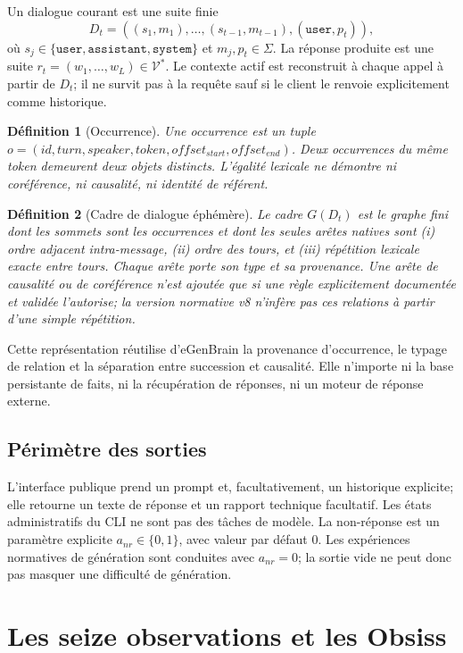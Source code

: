 \documentclass[11pt,a4paper]{report}
\newtheorem{definition}{Définition}[chapter]
\newcommand{\V}{\mathcal V}
\begin{document}
Un dialogue courant est une suite finie
\[
D_t=((s_1,m_1),\ldots,(s_{t-1},m_{t-1}),(\texttt{user},p_t)),
\]
où $s_j\in\{\texttt{user},\texttt{assistant},\texttt{system}\}$ et $m_j,p_t\in\Sigma$. La réponse produite est une suite $r_t=(w_1,\ldots,w_L)\in\V^*$. Le contexte actif est reconstruit à chaque appel à partir de $D_t$; il ne survit pas à la requête sauf si le client le renvoie explicitement comme historique.

\begin{definition}[Occurrence]
Une occurrence est un tuple $o=(id,turn,speaker,token,offset_{start},offset_{end})$. Deux occurrences du même token demeurent deux objets distincts. L'égalité lexicale ne démontre ni coréférence, ni causalité, ni identité de référent.
\end{definition}

\begin{definition}[Cadre de dialogue éphémère]
Le cadre $G(D_t)$ est le graphe fini dont les sommets sont les occurrences et dont les seules arêtes natives sont (i) ordre adjacent intra-message, (ii) ordre des tours, et (iii) répétition lexicale exacte entre tours. Chaque arête porte son type et sa provenance. Une arête de causalité ou de coréférence n'est ajoutée que si une règle explicitement documentée et validée l'autorise; la version normative v8 n'infère pas ces relations à partir d'une simple répétition.
\end{definition}

Cette représentation réutilise d'eGenBrain la provenance d'occurrence, le typage de relation et la séparation entre succession et causalité. Elle n'importe ni la base persistante de faits, ni la récupération de réponses, ni un moteur de réponse externe.

\section{Périmètre des sorties}
L'interface publique prend un prompt et, facultativement, un historique explicite; elle retourne un texte de réponse et un rapport technique facultatif. Les états administratifs du CLI ne sont pas des tâches de modèle. La non-réponse est un paramètre explicite $a_{nr}\in\{0,1\}$, avec valeur par défaut $0$. Les expériences normatives de génération sont conduites avec $a_{nr}=0$; la sortie vide ne peut donc pas masquer une difficulté de génération.

\chapter{Les seize observations et les Obsiss}
\end{document}
